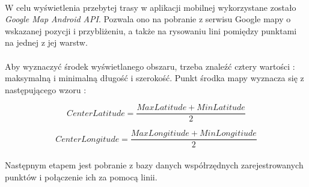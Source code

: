 \paragraph{} %


W celu wyświetlenia przebytej trasy w aplikacji mobilnej wykorzystane zostało \textit{Google Map Android API}. Pozwala ono na pobranie z serwisu Google mapy o wskazanej pozycji i przybliżeniu, a także na rysowaniu lini pomiędzy punktami na jednej z jej warstw. 

\paragraph{}
Aby wyznaczyć środek wyświetlanego obszaru, trzeba znaleźć cztery wartości : maksymalną i minimalną długość i szerokość. Punkt środka mapy wyznacza się z następującego wzoru :

\begin{equation}
	CenterLatitude = \frac{MaxLatitude + MinLatitude}{2}
\end{equation}

\begin{equation}
		CenterLongitude = \frac{MaxLongitiude + MinLongitiude}{2}
\end{equation}

\paragraph{} %
\label{par:}
Następnym etapem jest pobranie z bazy danych współrzędnych zarejestrowanych punktów i połączenie ich za pomocą linii.



